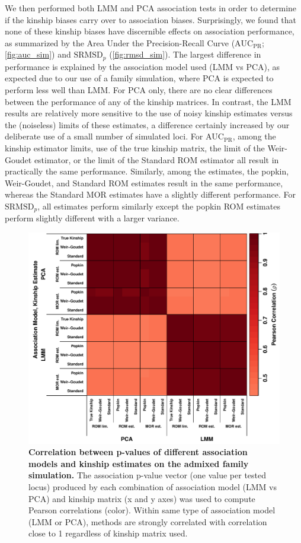 \documentclass[11pt]{article}
\newcommand{\rmsd}{\text{SRMSD}_p}
\newcommand{\auc}{\text{AUC}_\text{PR}}
\begin{document}
We then performed both LMM and PCA association tests in order to determine if the kinship biases carry over to association biases.
Surprisingly, we found that none of these kinship biases have discernible effects on association performance, as summarized by the Area Under the Precision-Recall Curve ($\auc$; \cref{fig:auc_sim}) and $\rmsd$ (\cref{fig:rmsd_sim}).
The largest difference in performance is explained by the association model used (LMM vs PCA), as expected due to our use of a family simulation, where PCA is expected to perform less well than LMM.
For PCA only, there are no clear differences between the performance of any of the kinship matrices.
In contrast, the LMM results are relatively more sensitive to the use of noisy kinship estimates versus the (noiseless) limits of these estimates, a difference certainly increased by our deliberate use of a small number of simulated loci.
For $\auc$, among the kinship estimator limits, use of the true kinship matrix, the limit of the Weir-Goudet estimator, or the limit of the Standard ROM estimator all result in practically the same performance.
Similarly, among the estimates, the popkin, Weir-Goudet, and Standard ROM estimates result in the same performance, whereas the Standard MOR estimates have a slightly different performance.
For $\rmsd$, all estimates perform similarly except the popkin ROM estimates perform slightly different with a larger variance.


\begin{figure}[bp!]
  \centering
  \includegraphics[width=\textwidth]{sim-admix-n1000-m100000-k3-f0.3-s0.5-mc100-h0.8-g20-fes/pvals_cor.pdf}
  \caption{
    {\bf Correlation between p-values of different association models and kinship estimates on the admixed family simulation.}
    The association p-value vector (one value per tested locus) produced by each combination of association model (LMM vs PCA) and kinship matrix (x and y axes) was used to compute Pearson correlations (color).
    Within same type of association model (LMM or PCA), methods are strongly correlated with correlation close to 1 regardless of kinship matrix used.
    }
  \label{fig:pvals_cor_sim}
\end{figure}
\end{document}
